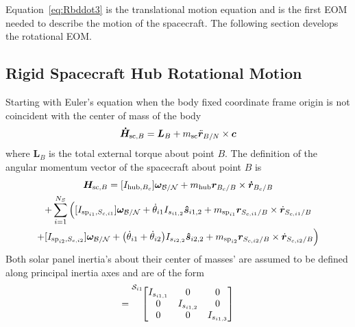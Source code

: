 \documentclass[paper]{aiaaNew}
\begin{document}
	Equation~\eqref{eq:Rbddot3} is the translational motion equation and is the first EOM needed to describe the motion of the spacecraft. The following section develops the rotational EOM.
	
	\subsection{Rigid Spacecraft Hub Rotational Motion}
	
	Starting with Euler's equation when the body fixed coordinate frame origin is not coincident with the center of mass of the body\cite{schaub}
	\begin{equation}
	\bm{\dot{H}}_{\text{sc},B} = \bm{L}_B+m_{\text{\text{sc}}}\ddot{\bm r}_{B/N}\times\bm{c}
	\label{eq:Euler}
	\end{equation}
	where $\bm{L}_B$ is the total external torque about point $B$. The definition of the angular momentum vector of the spacecraft about point $B$ is
	\begin{multline}
	\bm{H}_{\text{sc},B} = [I_{\text{hub},B_c}] \bm\omega_{\cal B/N} + m_{\text{hub}} \bm{r}_{B_c/B}\times\bm{\dot{r}}_{B_c/B} \\ +\sum\limits_{i=1}^{N_S}\Big( [I_{\text{sp}_{i1},S_{c,i1}}] \bm\omega_{\cal B/N} + \dot{\theta}_{i1} I_{s_{i1,2}}\bm{\hat{s}}_{i1,2}+m_{\text{sp}_{i1}} \bm{r}_{S_{c,i1}/B} \times \dot{\bm r}_{S_{c,i1}/B}\\
	+ [I_{\text{sp}_{i2},S_{c,i2}}] \bm\omega_{\cal B/N} + \big(\dot{\theta}_{i1} + \dot{\theta}_{i2}\big) I_{s_{i2,2}}\bm{\hat{s}}_{i2,2}+m_{\text{sp}_{i2}} \bm{r}_{S_{c,i2}/B} \times \dot{\bm r}_{S_{c,i2}/B}\Big)
	\label{eq:Hb2}
	\end{multline}
	Both solar panel inertia's about their center of masses' are assumed to be defined along principal inertia axes and are of the form
	\begin{equation}
	[I_{\text{sp}_{i1},S_{c,i1}}] = {\vphantom{\begin{bmatrix}
		I_{s_{i1,1}} & 0 & 0 \\
		0 & I_{s_{i1,2}} & 0 \\
		0 & 0 & I_{s_{i1,3}}
		\end{bmatrix}}}^{\mathcal{S}_{i1}\!}{\begin{bmatrix}
	I_{s_{i1,1}} & 0 & 0 \\
	0 & I_{s_{i1,2}} & 0 \\
	0 & 0 & I_{s_{i1,3}}
	\end{bmatrix}} 
	\label{eq:IspMatrix}
	\end{equation}
	
\end{document}
